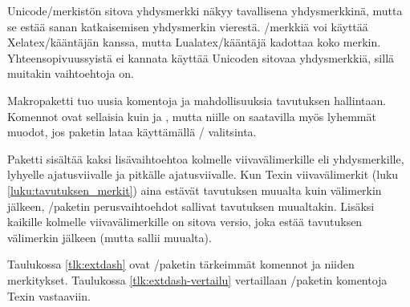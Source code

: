 Unicode\-/merkistön sitova yhdysmerkki  näkyy tavallisena yhdysmerkkinä, mutta se estää sanan
katkaisemisen yhdysmerkin vierestä. \-/merkkiä voi
käyttää Xelatex\-/kääntäjän kanssa, mutta Lualatex\-/kääntäjä kadottaa
koko merkin. Yhteensopivuussyistä ei kannata käyttää Unicoden sitovaa
yhdysmerkkiä, sillä muitakin vaihtoehtoja on.

Makropaketti  tuo uusia komentoja ja
mahdollisuuksia tavutuksen hallintaan. Komennot ovat sellaisia kuin
 ja , mutta niille on saatavilla myös
lyhemmät muodot, jos paketin lataa käyttämällä \-/
valitsinta.

\begin{koodilohkosis}
\usepackage[shortcuts]{extdash}
\end{koodilohkosis}

Paketti sisältää kaksi lisävaihtoehtoa kolmelle viivavälimerkille
eli yhdysmerkille, lyhyelle ajatusviivalle ja pitkälle ajatusviivalle.
Kun Texin viivavälimerkit (luku \ref{luku:tavutuksen_merkit}) aina
estävät tavutuksen muualta kuin välimerkin jälkeen,
\-/paketin perusvaihtoehdot sallivat tavutuksen
muualtakin. Lisäksi kaikille kolmelle viivavälimerkille on sitova
versio, joka estää tavutuksen välimerkin jälkeen (mutta sallii muualta).

Taulukossa \ref{tlk:extdash} ovat \-/paketin tärkeimmät
komennot ja niiden merkitykset. Taulukossa \ref{tlk:extdash-vertailu}
vertaillaan \-/paketin komentoja Texin vastaaviin.


